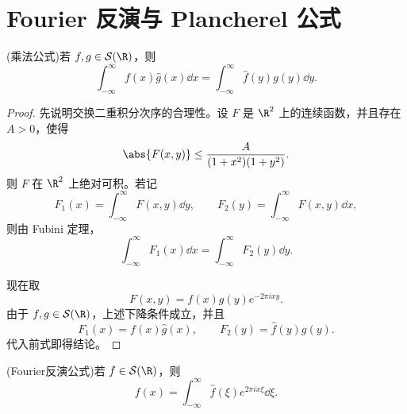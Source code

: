 \section{Fourier 反演与 Plancherel 公式}

\begin{proposition}\label{prop:fourier-pairing}
	(乘法公式)若 $f,g\in\mathcal S(\R)$，则
	\[
	\int_{-\infty}^{\infty}f(x)\widehat g(x)\dd x
	=
	\int_{-\infty}^{\infty}\widehat f(y)g(y)\dd y.
	\]
\end{proposition}

\begin{proof}
	先说明交换二重积分次序的合理性。设 $F$ 是 $\R^2$ 上的连续函数，并且存在 $A>0$，使得
	\[
	\abs{F(x,y)}\leq \frac{A}{(1+x^2)(1+y^2)}.
	\]
	则 $F$ 在 $\R^2$ 上绝对可积。若记
	\[
	F_1(x)=\int_{-\infty}^{\infty}F(x,y)\dd y,
	\qquad
	F_2(y)=\int_{-\infty}^{\infty}F(x,y)\dd x,
	\]
	则由 Fubini 定理，
	\[
	\int_{-\infty}^{\infty}F_1(x)\dd x
	=
	\int_{-\infty}^{\infty}F_2(y)\dd y.
	\]
	
	现在取
	\[
	F(x,y)=f(x)g(y)e^{-2\pi ixy}.
	\]
	由于 $f,g\in\mathcal S(\R)$，上述下降条件成立，并且
	\[
	F_1(x)=f(x)\widehat g(x),
	\qquad
	F_2(y)=\widehat f(y)g(y).
	\]
	代入前式即得结论。
\end{proof}

\begin{theorem}[Fourier 反演]\label{thm:fourier-inversion-schwartz}
	(Fourier反演公式)若 $f\in\mathcal S(\R)$，则
	\[
	f(x)=\int_{-\infty}^{\infty}\widehat f(\xi)e^{2\pi ix\xi}\dd\xi.
	\]
\end{theorem}

